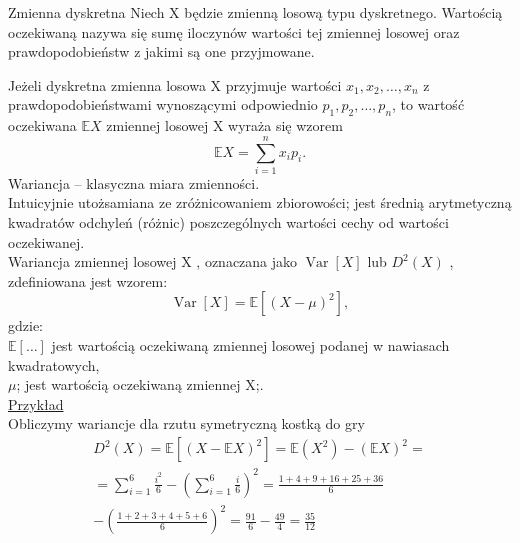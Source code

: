 \documentclass[10pt,a4paper]{report}
\begin{document}
Zmienna dyskretna
Niech X będzie zmienną losową typu dyskretnego. Wartością oczekiwaną nazywa się sumę iloczynów wartości tej zmiennej losowej oraz prawdopodobieństw z jakimi są one przyjmowane.

Jeżeli dyskretna zmienna losowa X przyjmuje wartości $x_1, x_2, \dots, x_n$ z prawdopodobieństwami wynoszącymi odpowiednio $p_1, p_2, \dots, p_n$, to wartość oczekiwana $\mathbb EX$ zmiennej losowej X wyraża się wzorem
\begin{equation}
\mathbb EX = \sum_{i=1}^n x_i p_i.
\end{equation}
Wariancja – klasyczna miara zmienności.\\
 Intuicyjnie utożsamiana ze zróżnicowaniem zbiorowości; jest średnią arytmetyczną kwadratów odchyleń (różnic) poszczególnych wartości cechy od wartości oczekiwanej.\\
Wariancja zmiennej losowej  X , oznaczana jako  $\operatorname{Var}[X]$  lub  $D^2 (X)$ , zdefiniowana jest wzorem:
\begin{equation*}
\operatorname{Var}[X]=\mathbb E[(X-\mu)^2],
\end{equation*}
gdzie:\\
$\mathbb E[\dots ]$ jest wartością oczekiwaną zmiennej losowej podanej w nawiasach kwadratowych,\\
$\mu$; jest wartością oczekiwaną zmiennej X;.\\
\underline{Przykład}\\
Obliczymy wariancje dla rzutu symetryczną kostką do gry\\
\begin{eqnarray*}
D^2(X)=\mathbb E[(X-\mathbb EX)^2]=\mathbb E(X^2)- (\mathbb EX)^2=\\
=\sum_{i=1}^{6}\frac{i^2}{6}-(\sum_{i=1}^{6}\frac{i}{6})^2=\frac{1+4+9+16+25+36}{6}\\
-(\frac{1+2+3+4+5+6}{6})^2=\frac{91}{6}-\frac{49}{4}=\frac{35}{12}
\end{eqnarray*}
\end{document}
